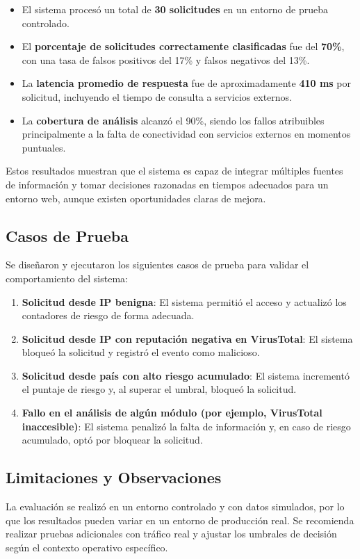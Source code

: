 \begin{itemize}
    \item El sistema procesó un total de \textbf{30 solicitudes} en un entorno de prueba controlado.
    \item El \textbf{porcentaje de solicitudes correctamente clasificadas} fue del \textbf{70\%}, con una tasa de falsos positivos del 17\% y falsos negativos del 13\%.
    \item La \textbf{latencia promedio de respuesta} fue de aproximadamente \textbf{410 ms} por solicitud, incluyendo el tiempo de consulta a servicios externos.
    \item La \textbf{cobertura de análisis} alcanzó el 90\%, siendo los fallos atribuibles principalmente a la falta de conectividad con servicios externos en momentos puntuales.
\end{itemize}

Estos resultados muestran que el sistema es capaz de integrar múltiples fuentes de información y tomar decisiones razonadas en tiempos adecuados para un entorno web, aunque existen oportunidades claras de mejora.

\subsection{Casos de Prueba}

Se diseñaron y ejecutaron los siguientes casos de prueba para validar el comportamiento del sistema:

\begin{enumerate}
    \item \textbf{Solicitud desde IP benigna}: El sistema permitió el acceso y actualizó los contadores de riesgo de forma adecuada.
    \item \textbf{Solicitud desde IP con reputación negativa en VirusTotal}: El sistema bloqueó la solicitud y registró el evento como malicioso.
    \item \textbf{Solicitud desde país con alto riesgo acumulado}: El sistema incrementó el puntaje de riesgo y, al superar el umbral, bloqueó la solicitud.
    \item \textbf{Fallo en el análisis de algún módulo (por ejemplo, VirusTotal inaccesible)}: El sistema penalizó la falta de información y, en caso de riesgo acumulado, optó por bloquear la solicitud.
\end{enumerate}

\subsection{Limitaciones y Observaciones}

La evaluación se realizó en un entorno controlado y con datos simulados, por lo que los resultados pueden variar en un entorno de producción real. Se recomienda realizar pruebas adicionales con tráfico real y ajustar los umbrales de decisión según el contexto operativo específico.
